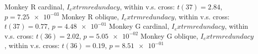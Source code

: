 Monkey R cardinal, $I_	extrm{redundacy}$, within v.s. cross: $t(37) = 2.84$, $p = \num{7.25e-03}$ 
Monkey R oblique, $I_	extrm{redundacy}$, within v.s. cross:  $t(37) = 0.77$, $p = \num{4.48e-01}$ 
Monkey G cardinal, $I_	extrm{redundacy}$, within v.s. cross: $t(36) = 2.02$, $p = \num{5.05e-02}$ 
Monkey G oblique, $I_	extrm{redundacy}$, within v.s. cross:  $t(36) = 0.19$, $p = \num{8.51e-01}$ 
